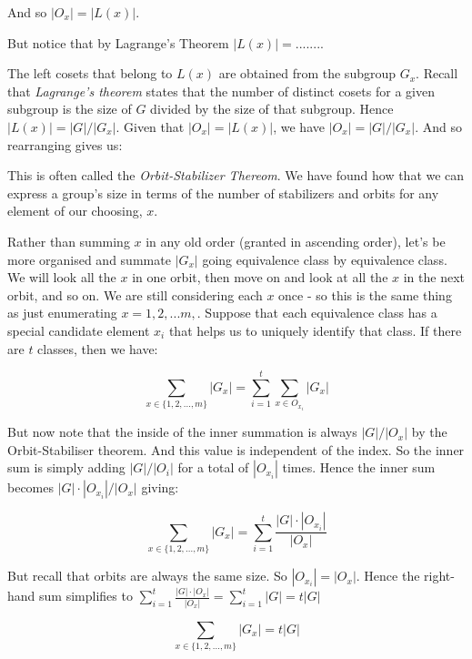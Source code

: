 \frmrule

And so $|O_x| = |L(x)|$. 

But notice that by Lagrange's Theorem $|L(x)| = ........$ 


The left cosets that belong to $L(x)$ are obtained from 
the subgroup $G_x$.
Recall that \textit{Lagrange's theorem} states that the number of 
distinct cosets for a given subgroup is the size of $G$ divided by 
the size of that subgroup. Hence $|L(x)| = |G|/|G_x|$. 
Given that $|O_x| = |L(x)|$, we have $|O_x| = |G|/|G_x|$. 
And so rearranging gives us: 

This is often called the \textit{Orbit-Stabilizer Thereom}. 
We have found how that we can express a group's size 
in terms of the number of stabilizers and orbits for any element 
of our choosing, $x$. 

\frmrule

Rather than summing $x$ in any old order (granted in ascending order), 
let's be more organised and summate $|G_x|$ going equivalence class by equivalence class. 
We will look all the $x$ in one orbit, then move on and look at all the $x$ in the next 
orbit, and so on. We are still considering each $x$ once - so this is the same thing as 
just enumerating $x = 1,2,...m,$. 
Suppose that each equivalence class has a special candidate element $x_i$ that helps 
us to uniquely identify that class. If there are $t$ classes, then we have:

$$\sum_{x \in \{1,2,...,m\}} |G_x| = \sum^{t}_{i = 1}\sum_{x \in O_{x_i}} |G_x|$$

But now note that the inside of the inner summation is always $|G|/|O_x|$ by the Orbit-Stabiliser theorem.
And this value is independent of the index. So the inner sum is simply adding $|G|/|O_i|$ 
for a total of $|O_{x_i}|$ times. Hence the inner sum becomes $|G|\cdot |O_{x_i}|/|O_x|$ giving:

$$\sum_{x \in \{1,2,...,m\}} |G_x| = \sum^{t}_{i = 1} \frac{|G|\cdot |O_{x_i}|}{|O_x|}$$

But recall that orbits are always the same size.
So $|O_{x_i}| = |O_x|$. Hence the right-hand sum simplifies to 
$\sum^{t}_{i = 1} \frac{|G|\cdot |O_{x}|}{|O_x|} = \sum^{t}_{i = 1} |G| = t|G|$


$$\sum_{x \in \{1,2,...,m\}} |G_x| = t|G|$$

